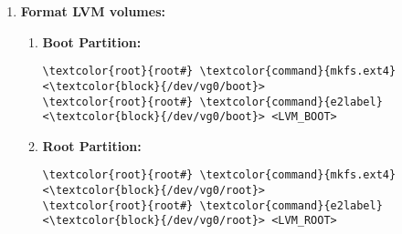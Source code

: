 \documentclass[10pt, a4paper, onecolumn, openany]{book} %
\begin{document}
\begin{enumerate}
\begin{enumerate}
    \item \textbf{Show LVM stuff:}
    \begin{itemize}
        \item \textbf{Physical Volumes:}
\begin{Verbatim}[commandchars=\\\{\}]
\textcolor{root}{root#} \textcolor{command}{lvm} pvdisplay
\end{Verbatim}            
        \item \textbf{Volume Groups:}
\begin{Verbatim}[commandchars=\\\{\}]
\textcolor{root}{root#} \textcolor{command}{lvm} vgdisplay [vg0]
\end{Verbatim}         
        \item \textbf{Logical Volumes:}
\begin{Verbatim}[commandchars=\\\{\}]
\textcolor{root}{root#} \textcolor{command}{lvm} lvdisplay
\end{Verbatim}       
        \end{itemize}
    \end{enumerate}

    \item \textbf{Format LVM volumes:}
    \begin{enumerate}
        \item \textbf{Boot Partition:}
\begin{Verbatim}[commandchars=\\\{\}]
\textcolor{root}{root#} \textcolor{command}{mkfs.ext4} <\textcolor{block}{/dev/vg0/boot}>
\textcolor{root}{root#} \textcolor{command}{e2label} <\textcolor{block}{/dev/vg0/boot}> <LVM_BOOT>
\end{Verbatim}        
        \item \textbf{Root Partition:}
\begin{Verbatim}[commandchars=\\\{\}]
\textcolor{root}{root#} \textcolor{command}{mkfs.ext4} <\textcolor{block}{/dev/vg0/root}>
\textcolor{root}{root#} \textcolor{command}{e2label} <\textcolor{block}{/dev/vg0/root}> <LVM_ROOT>
\end{Verbatim}  
    \end{enumerate}
    
\end{enumerate}
\end{document}
